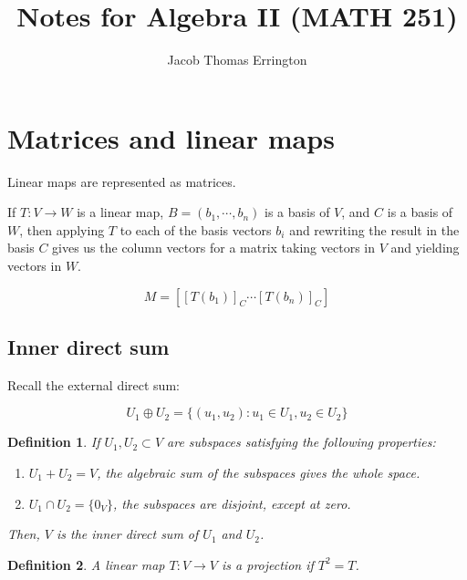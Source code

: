 \documentclass{article}
\author{Jacob Thomas Errington}
\title{Notes for Algebra II (MATH 251)}
\newtheorem{definition}{Definition}
\begin{document}
\maketitle

\section{Matrices and linear maps}

Linear maps are represented as matrices.

If $T : V \to W$ is a linear map, $B = (b_1, \cdots, b_n)$ is a basis of
$V$, and $C$ is a basis of $W$, then applying $T$ to each of the basis vectors
$b_i$ and rewriting the result in the basis $C$ gives us the column vectors for
a matrix taking vectors in $V$ and yielding vectors in $W$.

\begin{equation}
    M = \left[ [T(b_1)]_C \cdots [T(b_n)]_C \right]
\end{equation}

\subsection{Inner direct sum}

Recall the external direct sum:

\begin{equation}
    U_1 \oplus U_2 = \{(u_1, u_2) : u_1 \in U_1, u_2 \in U_2\}
\end{equation}

\begin{definition}
    If $U_1, U_2 \subset V$ are subspaces satisfying the following
    properties:
    \begin{enumerate}
        \item $U_1 + U_2 = V$, the algebraic sum of the subspaces gives the whole
            space.
        \item $U_1 \cap U_2 = \{0_V\}$, the subspaces are disjoint, except at zero.
    \end{enumerate}

    Then, $V$ is the inner direct sum of $U_1$ and $U_2$.
\end{definition}

\begin{definition}
    A linear map $T : V \to V$ is a \emph{projection} if $T^2 = T$.
\end{definition}
\end{document}
